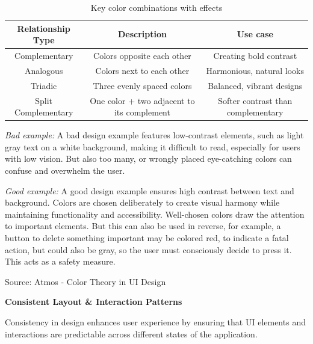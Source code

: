 \begin{table} [H]
    \centering
    \begin{tabular} {|c|c|c|}
        \hline
        \multicolumn{1}{|c|}{\textbf{Relationship Type}} &
        \multicolumn{1}{c|}{\textbf{Description}}  &
        \multicolumn{1}{c|}{\textbf{Use case}}  \\
        
        \hline
        Complementary & Colors opposite each other & Creating bold contrast\\
        \hline
        Analogous & Colors next to each other & Harmonious, natural looks\\
        \hline
        Triadic & Three evenly spaced colors & Balanced, vibrant designs\\
        \hline
        Split Complementary & One color + two adjacent to its complement & Softer contrast than complementary\\
        \hline        
    \end{tabular}
    \caption{Key color combinations with effects}
    \label{Table:ColorCombinations}
\end{table}

    
\blankLine

\textit{Bad example:}
A bad design example features low-contrast elements, such as light gray text on a white background, making it difficult to read, especially for users with low vision. But also too many, or wrongly placed eye-catching colors can confuse and overwhelm the user.

\blankLine

\textit{Good example:}
A good design example ensures high contrast between text and background. Colors are chosen deliberately to create visual harmony while maintaining functionality and accessibility. Well-chosen colors draw the attention to important elements. But this can also be used in reverse, for example, a button to delete something important may be colored red, to indicate a fatal action, but could also be gray, so the user must consciously decide to press it. This acts as a safety measure.

\blankLine

Source: Atmos - Color Theory in UI Design

\blankLine

\textbf{Consistent Layout \& Interaction Patterns}

Consistency in design enhances user experience by ensuring that UI elements and interactions are predictable across different states of the application. 

